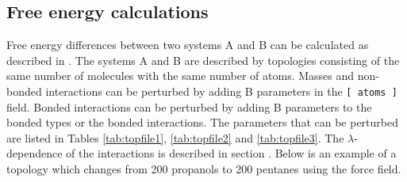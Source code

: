 \subsection{Free energy calculations}
Free energy differences between two systems A and B can be calculated as
described in .
The systems A and B are described by topologies
consisting of the same number of molecules with the same number of
atoms. Masses and non-bonded interactions can be perturbed by adding B
parameters in the {\tt [~atoms~]} field. Bonded interactions can be 
perturbed by adding B parameters to the bonded types or the bonded
interactions. The parameters that can be perturbed are listed in  
Tables \ref{tab:topfile1}, \ref{tab:topfile2} and \ref{tab:topfile3}.
The $\lambda$-dependence of the interactions is described
in section .
Below is an example of a topology which changes from 200 propanols to
200 pentanes using the  force field.

